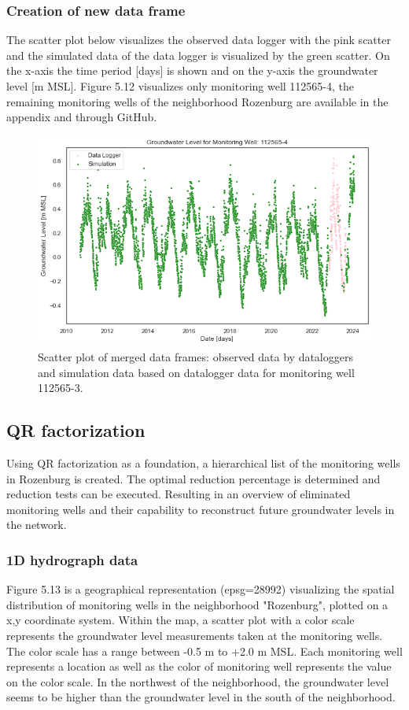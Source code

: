 \subsubsection{Creation of new data frame}
The scatter plot below visualizes the observed data logger with the pink scatter and the simulated data of the data logger is visualized by the green scatter. On the x-axis the time period [days] is shown and on the y-axis the groundwater level [m MSL]. Figure 5.12 visualizes only monitoring well 112565-4, the remaining monitoring wells of the neighborhood Rozenburg are available in the appendix and through GitHub.

\begin{figure}[htbp]
    \centering
    \includegraphics[width=0.80\linewidth]{figures/res roz/sc1125654.png}
    \caption{Scatter plot of merged data frames: observed data by dataloggers and simulation data based on datalogger data for monitoring well 112565-3.}
\end{figure}

\clearpage

\subsection{QR factorization}
Using QR factorization as a foundation, a hierarchical list of the monitoring wells in Rozenburg is created. The optimal reduction percentage is determined and reduction tests can be executed. Resulting in an overview of eliminated monitoring wells and their capability to reconstruct future groundwater levels in the network.

\subsubsection{1D hydrograph data}
Figure 5.13 is a geographical representation (epsg=28992) visualizing the spatial distribution of monitoring wells in the neighborhood "Rozenburg", plotted on a x,y coordinate system. Within the map, a scatter plot with a color scale represents the groundwater level measurements taken at the monitoring wells. The color scale has a range between -0.5 m to +2.0 m MSL. Each monitoring well represents a location as well as the color of monitoring well represents the value on the color scale. In the northwest of the neighborhood, the groundwater level seems to be higher than the groundwater level in the south of the neighborhood. 

